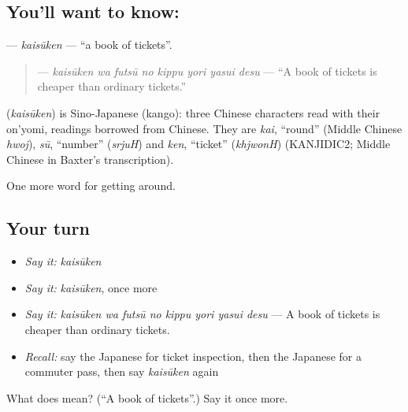 \subsection*{You'll want to know: }
\textbf{} — \emph{kaisūken} — \textquotedblleft{}a book of tickets\textquotedblright{}.

\begin{quote}
\textbf{   } — \emph{kaisūken wa futsū no kippu yori yasui desu} — \textquotedblleft{}A book of tickets is cheaper than ordinary tickets.\textquotedblright{}
\end{quote}

\begin{cousinweb}
\textbf{} (\emph{kaisūken}) is Sino-Japanese (kango): three Chinese characters read with their on'yomi, readings borrowed from Chinese. They are \emph{kai}, \textquotedblleft{}round\textquotedblright{} (Middle Chinese \emph{hwoj}), \emph{sū}, \textquotedblleft{}number\textquotedblright{} (\emph{srjuH}) and \emph{ken}, \textquotedblleft{}ticket\textquotedblright{} (\emph{khjwonH}) (KANJIDIC2; Middle Chinese in Baxter's transcription).
\end{cousinweb}

\begin{grammarlens}[title={What you've built}]
One more word for getting around.
\end{grammarlens}

\subsection*{Your turn}
\begin{itemize}
\raggedright
  \item \emph{Say it:} \emph{kaisūken}
  \item \emph{Say it:} \emph{kaisūken}, once more
  \item \emph{Say it:} \emph{kaisūken wa futsū no kippu yori yasui desu} — A book of tickets is cheaper than ordinary tickets.
  \item \emph{Recall:} say the Japanese for ticket inspection, then the Japanese for a commuter pass, then say \emph{kaisūken} again
\end{itemize}

\begin{tcolorbox}[breakable,colback=teal!4,colframe=teal!35!black,title={Before you move on}]
What does  mean? (\textquotedblleft{}A book of tickets\textquotedblright{}.) Say it once more.
\end{tcolorbox}
